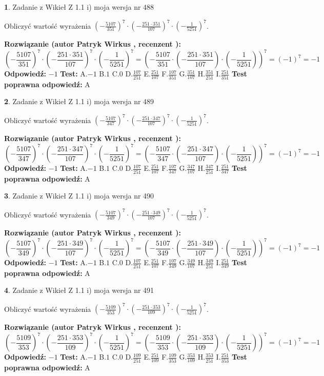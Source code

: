 \documentclass[12pt, a4paper]{article}
\theoremstyle{definition} %
\newtheorem{zad}{}
\newcommand{\zadStart}[1]{\begin{zad}#1\newline}
\newcommand{\zadStop}{\end{zad}}
\newcommand{\rozwStart}[2]{\noindent \textbf{Rozwiązanie (autor #1 , recenzent #2): }\newline}
\newcommand{\rozwStop}{\newline}
\newcommand{\odpStart}{\noindent \textbf{Odpowiedź:}\newline}
\newcommand{\odpStop}{\newline}
\newcommand{\testStart}{\noindent \textbf{Test:}\newline}
\newcommand{\testStop}{\newline}
\newcommand{\kluczStart}{\noindent \textbf{Test poprawna odpowiedź:}\newline}
\newcommand{\kluczStop}{\newline}
\begin{document}
\zadStart{Zadanie z Wikieł Z 1.1 i) moja wersja nr 488}

Obliczyć wartość wyrażenia $(-\frac{5107}{351})^{7} \cdot (-\frac{251 \cdot 351}{107})^{7} \cdot (-\frac{1}{5251})^{7}$.
\zadStop
\rozwStart{Patryk Wirkus}{}
$$(-\frac{5107}{351})^{7} \cdot (-\frac{251 \cdot 351}{107})^{7} \cdot (-\frac{1}{5251})^{7} = (-\frac{5107}{351} \cdot (-\frac{251 \cdot 351}{107}) \cdot (-\frac{1}{5251}))^{7} = (-1)^{7} = -1$$
\rozwStop
\odpStart
$-1$
\odpStop
\testStart
A.$-1$ B.$1$ C.$0$ D.$\frac{107}{251}$ E.$\frac{251}{107}$
F.$\frac{107}{351}$ G.$\frac{351}{107}$
H.$\frac{351}{251}$
I.$\frac{251}{351}$
\testStop
\kluczStart
A
\kluczStop



\zadStart{Zadanie z Wikieł Z 1.1 i) moja wersja nr 489}

Obliczyć wartość wyrażenia $(-\frac{5107}{347})^{7} \cdot (-\frac{251 \cdot 347}{107})^{7} \cdot (-\frac{1}{5251})^{7}$.
\zadStop
\rozwStart{Patryk Wirkus}{}
$$(-\frac{5107}{347})^{7} \cdot (-\frac{251 \cdot 347}{107})^{7} \cdot (-\frac{1}{5251})^{7} = (-\frac{5107}{347} \cdot (-\frac{251 \cdot 347}{107}) \cdot (-\frac{1}{5251}))^{7} = (-1)^{7} = -1$$
\rozwStop
\odpStart
$-1$
\odpStop
\testStart
A.$-1$ B.$1$ C.$0$ D.$\frac{107}{251}$ E.$\frac{251}{107}$
F.$\frac{107}{347}$ G.$\frac{347}{107}$
H.$\frac{347}{251}$
I.$\frac{251}{347}$
\testStop
\kluczStart
A
\kluczStop



\zadStart{Zadanie z Wikieł Z 1.1 i) moja wersja nr 490}

Obliczyć wartość wyrażenia $(-\frac{5107}{349})^{7} \cdot (-\frac{251 \cdot 349}{107})^{7} \cdot (-\frac{1}{5251})^{7}$.
\zadStop
\rozwStart{Patryk Wirkus}{}
$$(-\frac{5107}{349})^{7} \cdot (-\frac{251 \cdot 349}{107})^{7} \cdot (-\frac{1}{5251})^{7} = (-\frac{5107}{349} \cdot (-\frac{251 \cdot 349}{107}) \cdot (-\frac{1}{5251}))^{7} = (-1)^{7} = -1$$
\rozwStop
\odpStart
$-1$
\odpStop
\testStart
A.$-1$ B.$1$ C.$0$ D.$\frac{107}{251}$ E.$\frac{251}{107}$
F.$\frac{107}{349}$ G.$\frac{349}{107}$
H.$\frac{349}{251}$
I.$\frac{251}{349}$
\testStop
\kluczStart
A
\kluczStop



\zadStart{Zadanie z Wikieł Z 1.1 i) moja wersja nr 491}

Obliczyć wartość wyrażenia $(-\frac{5109}{353})^{7} \cdot (-\frac{251 \cdot 353}{109})^{7} \cdot (-\frac{1}{5251})^{7}$.
\zadStop
\rozwStart{Patryk Wirkus}{}
$$(-\frac{5109}{353})^{7} \cdot (-\frac{251 \cdot 353}{109})^{7} \cdot (-\frac{1}{5251})^{7} = (-\frac{5109}{353} \cdot (-\frac{251 \cdot 353}{109}) \cdot (-\frac{1}{5251}))^{7} = (-1)^{7} = -1$$
\rozwStop
\odpStart
$-1$
\odpStop
\testStart
A.$-1$ B.$1$ C.$0$ D.$\frac{109}{251}$ E.$\frac{251}{109}$
F.$\frac{109}{353}$ G.$\frac{353}{109}$
H.$\frac{353}{251}$
I.$\frac{251}{353}$
\testStop
\kluczStart
A
\kluczStop
\end{document}
